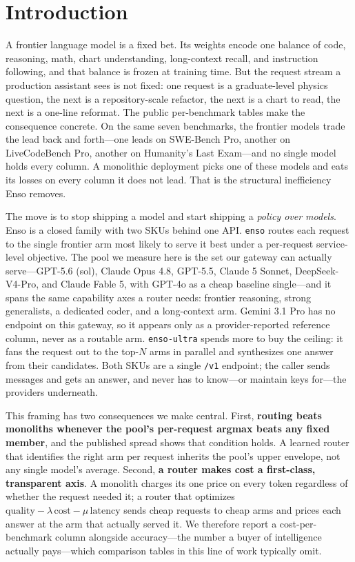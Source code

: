 \documentclass[11pt]{article}
\begin{document}
\section{Introduction}
\label{sec:intro}

A frontier language model is a fixed bet. Its weights encode one balance of code,
reasoning, math, chart understanding, long-context recall, and instruction
following, and that balance is frozen at training time. But the request stream a
production assistant sees is not fixed: one request is a graduate-level physics
question, the next is a repository-scale refactor, the next is a chart to read,
the next is a one-line reformat. The public per-benchmark tables make the
consequence concrete. On the same seven benchmarks, the frontier models trade the
lead back and forth---one leads on SWE-Bench Pro, another on LiveCodeBench Pro,
another on Humanity's Last Exam---and no single model holds every column. A
monolithic deployment picks one of these models and eats its losses on every
column it does not lead. That is the structural inefficiency Enso removes.

The move is to stop shipping a model and start shipping a \emph{policy over
models}. Enso is a closed family with two SKUs behind one API. \texttt{enso}
routes each request to the single frontier arm most likely to serve it best under
a per-request service-level objective. The pool we measure here is the set our
gateway can actually serve---GPT-5.6 (sol), Claude Opus 4.8, GPT-5.5, Claude 5
Sonnet, DeepSeek-V4-Pro, and Claude Fable 5, with GPT-4o as a cheap baseline
single---and it spans the same capability axes a router needs: frontier reasoning,
strong generalists, a dedicated coder, and a long-context arm. Gemini 3.1 Pro has
no endpoint on this gateway, so it appears only as a provider-reported reference
column, never as a routable arm. \texttt{enso-ultra} spends more to buy the
ceiling: it fans the request
out to the top-$N$ arms in parallel and synthesizes one answer from their
candidates. Both SKUs are a single \texttt{/v1} endpoint; the caller sends
messages and gets an answer, and never has to know---or maintain keys for---the
providers underneath.

This framing has two consequences we make central. First, \textbf{routing beats
monoliths whenever the pool's per-request argmax beats any fixed member}, and the
published spread shows that condition holds. A learned router that identifies the
right arm per request inherits the pool's upper envelope, not any single model's
average. Second, \textbf{a router makes cost a first-class, transparent axis}. A
monolith charges its one price on every token regardless of whether the request
needed it; a router that optimizes $\mathrm{quality}-\lambda\,\mathrm{cost}-\mu\,\mathrm{latency}$
sends cheap requests to cheap arms and prices each answer at the arm that actually
served it. We therefore report a cost-per-benchmark column alongside accuracy---the
number a buyer of intelligence actually pays---which comparison tables in this
line of work typically omit.
\end{document}
